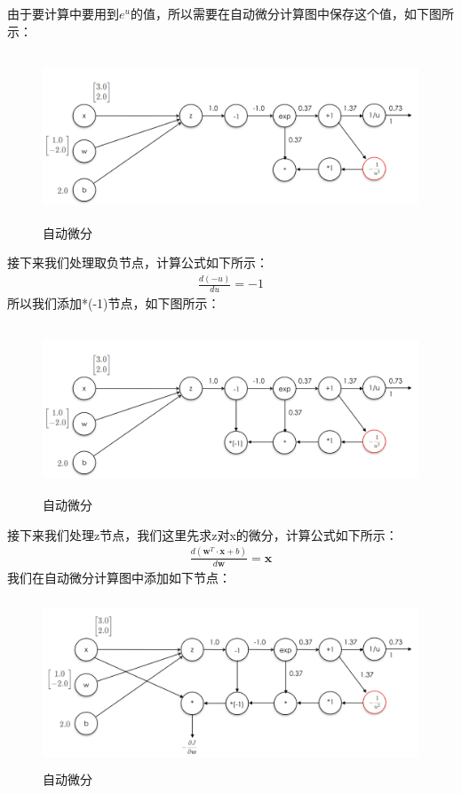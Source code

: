 \documentclass[UTF8]{article}
\begin{document}
由于要计算中要用到$e^u$的值，所以需要在自动微分计算图中保存这个值，如下图所示：
\begin{figure}[H]
	\caption{自动微分}
	\label{f000052}
	\centering
	\includegraphics[height=5cm]{images/f000052}
\end{figure}
接下来我们处理取负节点，计算公式如下所示：
\begin{equation}
\begin{aligned}
\frac{d(-u)}{du}=-1
\end{aligned}
\label{mlp-sigmoid-cg-15}
\end{equation}
所以我们添加*(-1)节点，如下图所示：
\begin{figure}[H]
	\caption{自动微分}
	\label{f000053}
	\centering
	\includegraphics[height=5cm]{images/f000053}
\end{figure}
接下来我们处理z节点，我们这里先求z对x的微分，计算公式如下所示：
\begin{equation}
\begin{aligned}
\frac{d(\boldsymbol{w}^T \cdot \boldsymbol{x}+b)}{d\boldsymbol{w}}=\boldsymbol{x}
\end{aligned}
\label{mlp-sigmoid-cg-16}
\end{equation}
我们在自动微分计算图中添加如下节点：
\begin{figure}[H]
	\caption{自动微分}
	\label{f000054}
	\centering
	\includegraphics[height=5cm]{images/f000054}
\end{figure}
\end{document}
